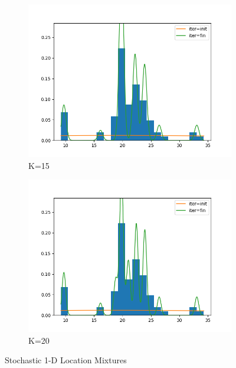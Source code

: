 \begin{figure}
     \hfill
     \begin{subfigure}[b]{0.3\textwidth}
         \centering
         \includegraphics[width=\textwidth]{../code/stochastic_loc_only_plots/galaxies_hist_k_15.png}
         \caption{K=15}
         \label{fig:Stoch_loc_only15}
     \end{subfigure}
     \hfill
     \begin{subfigure}[b]{0.3\textwidth}
         \centering
         \includegraphics[width=\textwidth]{../code/stochastic_loc_only_plots/galaxies_hist_k_20.png}
         \caption{K=20}
         \label{fig:Stoch_loc_only20}
     \end{subfigure}
        \caption{Stochastic 1-D Location Mixtures}
        \label{fig:Stoch_loc_only}
\end{figure}
